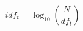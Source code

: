 \documentclass[preview]{standalone}
\begin{document}
\begin{align*}
idf_t = \log_{10}\!\left(\dfrac{N}{df_t}\right)
\end{align*}
\end{document}
